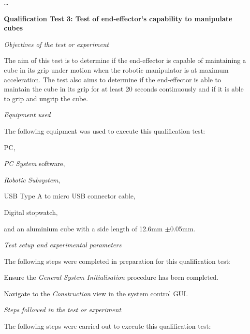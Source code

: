 \ldots

\textbf{Qualification Test 3: Test of end-effector's capability to manipulate cubes}

\textit{Objectives of the test or experiment}

The aim of this test is to determine if the end-effector is capable of maintaining a cube in its grip under motion when the robotic manipulator is at maximum acceleration. The test also aims to determine if the end-effector is able to maintain the cube in its grip for at least 20 seconds continuously and if it is able to grip and ungrip the cube.

\textit{Equipment used}

The following equipment was used to execute this qualification test:

\begin{compactitem}
	\item PC,
	\item \textit{PC System} software,
	\item \textit{Robotic Subsystem},
	\item USB Type A to micro USB connector cable,
	\item Digital stopwatch,
	\item and an aluminium cube with a side length of 12.6mm $\pm$0.05mm.
\end{compactitem}

\textit{Test setup and experimental parameters} 

The following steps were completed in preparation for this qualification test:

\begin{compactenum}
	\item Ensure the \textit{General System Initialisation} procedure has been completed.
	\item Navigate to the \textit{Construction} view in the system control GUI.
\end{compactenum}

\textit{Steps followed in the test or experiment}

The following steps were carried out to execute this qualification test:

